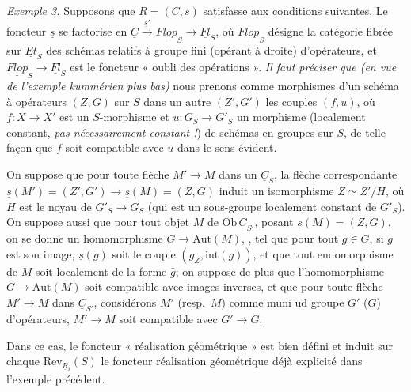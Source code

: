 \documentclass[11pt,a4paper]{article}
\begin{document}
\emph{Exemple 3.} Supposons que $\underline{R} = (\underline{C}, \underline{s})$
satisfasse aux conditions suivantes. Le foncteur $\underline{s}$ se factorise
en $\underline{C} \xrightarrow{\ \underline{s}'\ } \underline{Flop}_S \to
\underline{Fl}_S$, où $\underline{Flop}_S$ désigne la catégorie fibrée sur
$\underline{Et}_S$ des schémas relatifs à groupe fini (opérant à droite)
d'opérateurs, et $\underline{Flop}_S \to \underline{Fl}_S$ est le foncteur
« oubli des opérations ».  \emph{Il faut préciser que (en vue de l'exemple kummérien plus bas)}
nous prenons comme morphismes d'un schéma à opérateurs $(Z,G)$ sur $S$ dans un
autre $(Z',G')$ les couples $(f,u)$, où $f : X \to X'$ est un $S$-morphisme et
$u : G_S \to G'_S$ un morphisme (localement constant, \emph{pas nécessairement
constant !}) de schémas en groupes sur $S$, de telle façon que $f$ soit
compatible avec $u$ dans le sens évident.

On suppose que pour toute flèche $M' \to M$ dans un $\underline{C}_S$,
 la flèche correspondante $\underline{s}(M') = (Z',G') \to
\underline{s}(M) = (Z,G)$ induit un isomorphisme $Z \simeq Z'/H$, où $H$ est le
noyau de $G'_S \to G_S$ (qui est un sous-groupe localement constant de
$G'_S$). On suppose \struck{\ill{}} aussi que pour tout objet $M$ de
$\mathrm{Ob}\,\underline{C}_{S'}$, posant $\underline{s}(M) = (Z,G)$, on se
donne un  homomorphisme $G \to \mathrm{Aut}(M)$,
, tel que pour tout $g \in G$, si $\bar{g}$ est son image,
 $\underline{s}(\bar{g})$ soit le couple
$(g_Z, \mathrm{int}(g))$, et que tout endomorphisme de $M$ soit localement de
la forme $\bar{g}$; on  suppose de plus que
 l'homomorphisme $G \to \mathrm{Aut}(M)$ soit compatible avec images
inverses, et que pour toute flèche $M' \to M$ dans $\underline{C}_{S'}$,
considérons $M'$ (resp.\ $M$) comme muni ud groupe $G'$ ($G$) d'opérateurs,
$M' \to M$ soit compatible avec $G' \to G$.


Dans ce cas, le foncteur « réalisation géométrique » est bien défini et induit
sur chaque $\mathrm{Rev}_{\underline{R}_i}(S)$ le foncteur réalisation
géométrique déjà explicité dans l'exemple précédent.
\end{document}
